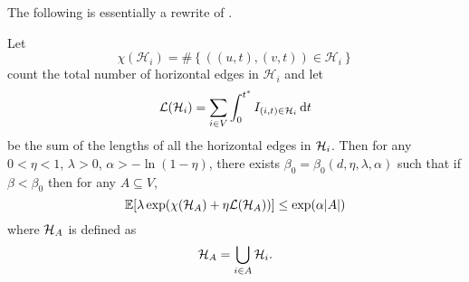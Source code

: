 The following is essentially a rewrite of \cite[Lemma 3.1]{Lubetzky2014-po}.
\begin{lemma}
	\label{lem:full submartingale thing}
	Let 
	\begin{equation}
		\chi(\mathcal{H}_i) = \#\left\{ \left( (u,t), (v,t) \right) \in \mathcal{H}_i \right\}
	\end{equation}
	count the total number of horizontal edges in $\mathcal{H}_i$ and let 
	\begin{equation}
		\mathcal{L}(\mathcal{H}_i) = \sum_{i \in V} \int_{0}^{t^*} I_{(i, t) \in \mathcal{H}_i} \, \mathrm{d} t
	\end{equation}
	be the sum of the lengths of all the horizontal edges in $\mathcal{H}_i$. Then for any $0<\eta<1$, $\lambda > 0$, $\alpha > -\ln(1 - \eta)$, there exists $\beta_0 = \beta_0(d, \eta, \lambda, \alpha)$ such that if $\beta < \beta_0$ then for any $A \subseteq V$,
	\begin{equation}
		\mathbb{E}[\lambda \exp(\chi(\mathcal{H}_A) + \eta \mathcal{L}(\mathcal{H}_A))] \leq \exp(\alpha |A|)
	\end{equation}
	where $\mathcal{H}_A$ is defined as
	\begin{equation}
		\mathcal{H}_A = \bigcup_{i \in A} \mathcal{H}_i.
	\end{equation}
\end{lemma}
